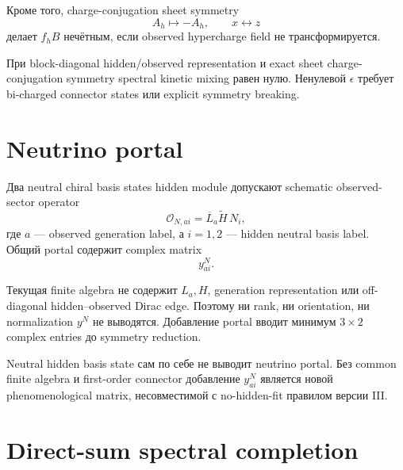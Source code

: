Кроме того, charge-conjugation sheet symmetry
\begin{equation}
 A_h\longmapsto-A_h,
 \qquad
 x\longleftrightarrow z
\end{equation}
делает \(f_hB\) нечётным, если observed hypercharge field не
трансформируется.

\begin{theorem}
При block-diagonal hidden/observed representation и exact sheet
charge-conjugation symmetry spectral kinetic mixing равен нулю.
Ненулевой \(\epsilon\) требует bi-charged connector states или explicit
symmetry breaking.
\end{theorem}

\section{Neutrino portal}

Два neutral chiral basis states hidden module допускают schematic
observed-sector operator
\begin{equation}
 \mathcal O_{N,ai}
 =
 \overline L_a\widetilde H\,N_i,
\end{equation}
где \(a\) --- observed generation label, а \(i=1,2\) --- hidden neutral
basis label. Общий portal содержит complex matrix
\begin{equation}
 y_{ai}^{N}.
\end{equation}

Текущая finite algebra не содержит \(L_a,H\), generation representation
или off-diagonal hidden--observed Dirac edge. Поэтому ни rank, ни
orientation, ни normalization \(y^N\) не выводятся. Добавление portal
вводит минимум \(3\times2\) complex entries до symmetry reduction.

\begin{nogocriterion}
Neutral hidden basis state сам по себе не выводит neutrino portal.
Без common finite algebra и first-order connector добавление
\(y_{ai}^N\) является новой phenomenological matrix, несовместимой с
no-hidden-fit правилом версии III.
\end{nogocriterion}

\section{Direct-sum spectral completion}

